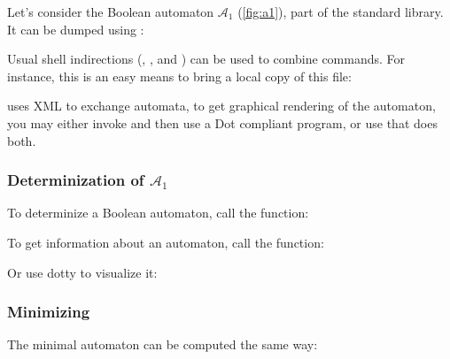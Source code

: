 Let's consider the Boolean automaton $\mathcal{A}_1$
(\autoref{fig:a1}), part of the standard library.  It can be dumped
using :


Usual shell indirections (\samp{|}, \samp{>}, and \samp{<}) can be
used to combine \tafkit commands.  For instance, this is an easy means
to bring a local copy of this file:


\tafkit uses XML to exchange automata, to get graphical rendering of
the automaton, you may either invoke  and then
use a Dot compliant program, or use  that does
both.

\begin{center}
\end{center}


\subsubsection{Determinization of $\mathcal{A}_1$}
To determinize a Boolean automaton, call the
 function:


To get information about an automaton, call the  function:

Or use dotty to visualize it:
\begin{center}
\end{center}

\subsubsection{Minimizing}

The minimal automaton can be computed the same way:
\begin{center}
\end{center}

